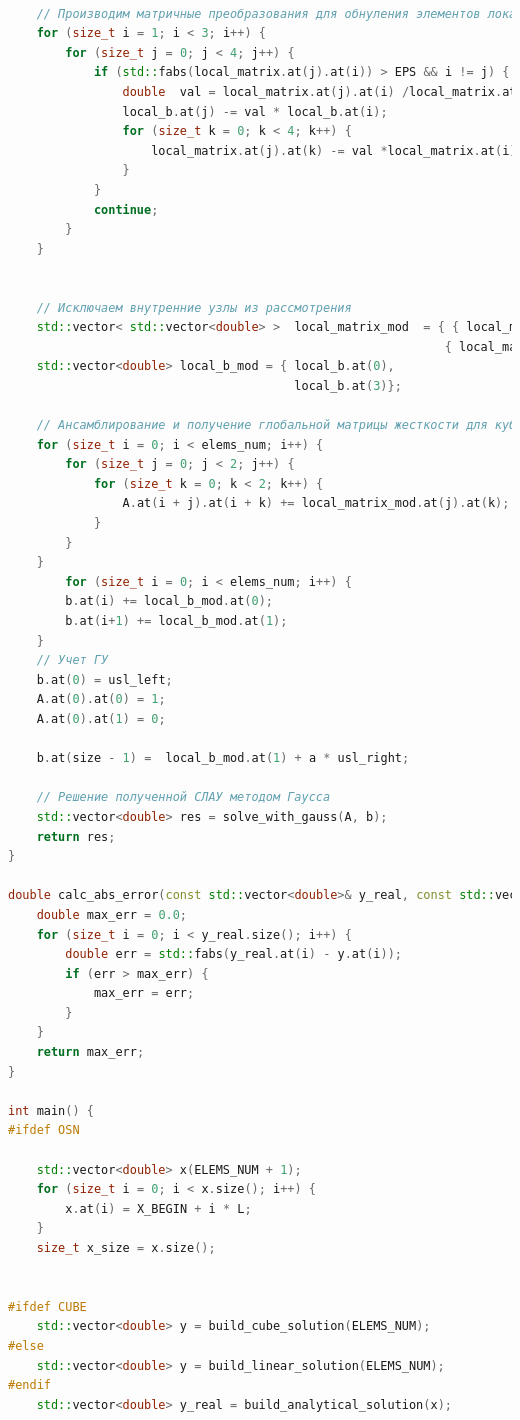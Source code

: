 \begin{lstlisting}[language=c++, label=prog,caption={\textit{Реализация МКЭ}}]
    
    // Производим матричные преобразования для обнуления элементов локальной матрицы жесткости, относящихся к внутренним узлам
    for (size_t i = 1; i < 3; i++) {
        for (size_t j = 0; j < 4; j++) {
            if (std::fabs(local_matrix.at(j).at(i)) > EPS && i != j) {
                double  val = local_matrix.at(j).at(i) /local_matrix.at(i).at(i);
                local_b.at(j) -= val * local_b.at(i);
                for (size_t k = 0; k < 4; k++) {
                    local_matrix.at(j).at(k) -= val *local_matrix.at(i).at(k);
                }
            }
            continue;
        }
    }
    
    
    // Исключаем внутренние узлы из рассмотрения
    std::vector< std::vector<double> >  local_matrix_mod  = { { local_matrix.at(0).at(0), local_matrix.at(0).at(3) },
                                                             { local_matrix.at(3).at(0), local_matrix.at(3).at(3) } };
    std::vector<double> local_b_mod = { local_b.at(0), 
                                        local_b.at(3)};
    
    // Ансамблирование и получение глобальной матрицы жесткости для кубического КЭ
    for (size_t i = 0; i < elems_num; i++) {
        for (size_t j = 0; j < 2; j++) {
            for (size_t k = 0; k < 2; k++) {
                A.at(i + j).at(i + k) += local_matrix_mod.at(j).at(k);
            }
        }
    }
        for (size_t i = 0; i < elems_num; i++) {
        b.at(i) += local_b_mod.at(0);
        b.at(i+1) += local_b_mod.at(1);
    }
    // Учет ГУ
    b.at(0) = usl_left;
    A.at(0).at(0) = 1;
    A.at(0).at(1) = 0;
    
    b.at(size - 1) =  local_b_mod.at(1) + a * usl_right;
    
    // Решение полученной СЛАУ методом Гаусса
    std::vector<double> res = solve_with_gauss(A, b);
    return res;
}

double calc_abs_error(const std::vector<double>& y_real, const std::vector<double>& y) {
    double max_err = 0.0;
    for (size_t i = 0; i < y_real.size(); i++) {
        double err = std::fabs(y_real.at(i) - y.at(i));
        if (err > max_err) {
            max_err = err;
        }
    }
    return max_err;
}

int main() {
#ifdef OSN

    std::vector<double> x(ELEMS_NUM + 1);
    for (size_t i = 0; i < x.size(); i++) {
        x.at(i) = X_BEGIN + i * L;
    }
    size_t x_size = x.size();
    

#ifdef CUBE
    std::vector<double> y = build_cube_solution(ELEMS_NUM);
#else
    std::vector<double> y = build_linear_solution(ELEMS_NUM);
#endif
    std::vector<double> y_real = build_analytical_solution(x);
     

\end{lstlisting}
